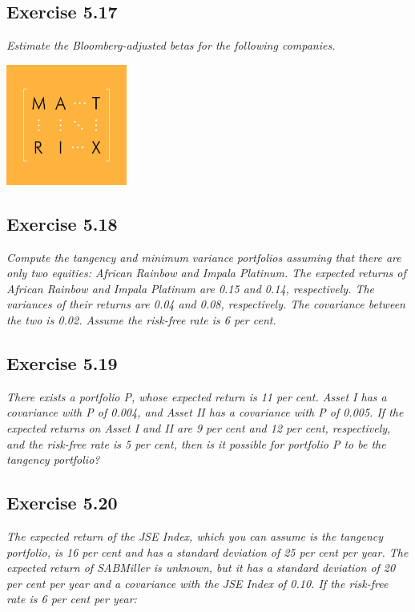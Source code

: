 \documentclass[]{book}
\theoremstyle{definition}
\theoremstyle{definition}
\theoremstyle{remark}
\begin{document}
\subsection{Exercise 5.17}\label{exercise-5.17}

\emph{Estimate the Bloomberg-adjusted betas for the following
companies.} \citep[p.162]{book}

\begin{center}\includegraphics[width=150px]{figures/matrix} \end{center}

\subsection{Exercise 5.18}\label{exercise-5.18}

\emph{Compute the tangency and minimum variance portfolios assuming that
there are only two equities: African Rainbow and Impala Platinum. The
expected returns of African Rainbow and Impala Platinum are 0.15 and
0.14, respectively. The variances of their returns are 0.04 and 0.08,
respectively. The covariance between the two is 0.02. Assume the
risk-free rate is 6 per cent.} \citep[p.162]{book}

\subsection{Exercise 5.19}\label{exercise-5.19}

\emph{There exists a portfolio P, whose expected return is 11 per cent.
Asset I has a covariance with P of 0.004, and Asset II has a covariance
with P of 0.005. If the expected returns on Asset I and II are 9 per
cent and 12 per cent, respectively, and the risk-free rate is 5 per
cent, then is it possible for portfolio P to be the tangency portfolio?}
\citep[p.162]{book}

\subsection{Exercise 5.20}\label{exercise-5.20}

\emph{The expected return of the JSE Index, which you can assume is the
tangency portfolio, is 16 per cent and has a standard deviation of 25
per cent per year. The expected return of SABMiller is unknown, but it
has a standard deviation of 20 per cent per year and a covariance with
the JSE Index of 0.10. If the risk-free rate is 6 per cent per year:}
\citep[p.162]{book}
\end{document}
